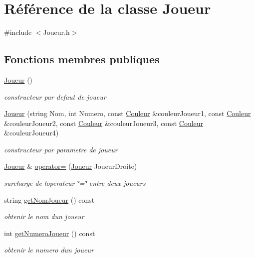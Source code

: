 \hypertarget{classJoueur}{}\section{Référence de la classe Joueur}
\label{classJoueur}


{\ttfamily \#include $<$Joueur.\+h$>$}

\subsection*{Fonctions membres publiques}
\begin{DoxyCompactItemize}
\item 
\hyperlink{classJoueur_add6c98be3020651d84f6d75ccc1d867e}{Joueur} ()
\begin{DoxyCompactList}\small\item\em constructeur par defaut de joueur \end{DoxyCompactList}\item 
\hyperlink{classJoueur_a6b021071dbc36373e27aeefe46b2f3a5}{Joueur} (string Nom, int Numero, const \hyperlink{classCouleur}{Couleur} \&couleur\+Joueur1, const \hyperlink{classCouleur}{Couleur} \&couleur\+Joueur2, const \hyperlink{classCouleur}{Couleur} \&couleur\+Joueur3, const \hyperlink{classCouleur}{Couleur} \&couleur\+Joueur4)
\begin{DoxyCompactList}\small\item\em constructeur par parametre de joueur \end{DoxyCompactList}\item 
\hyperlink{classJoueur}{Joueur} \& \hyperlink{classJoueur_a0a90bcc7315b9756bd7326a3576e03e2}{operator=} (\hyperlink{classJoueur}{Joueur} Joueur\+Droite)
\begin{DoxyCompactList}\small\item\em surcharge de l\textquotesingle{}operateur \char`\"{}=\char`\"{} entre deux joueurs \end{DoxyCompactList}\item 
string \hyperlink{classJoueur_a73a200ab69c2d527a63140e1cf03a5a6}{get\+Nom\+Joueur} () const 
\begin{DoxyCompactList}\small\item\em obtenir le nom d\textquotesingle{}un joueur \end{DoxyCompactList}\item 
int \hyperlink{classJoueur_ae786e53b4e6f69cac8469e03eae0ae8e}{get\+Numero\+Joueur} () const 
\begin{DoxyCompactList}\small\item\em obtenir le numero d\textquotesingle{}un joueur \end{DoxyCompactList}\item 

\end{DoxyCompactItemize}
